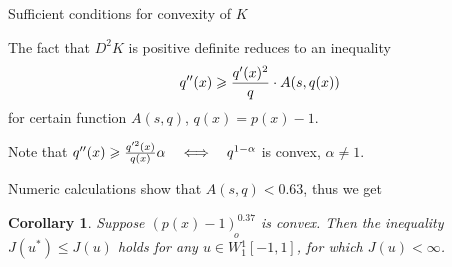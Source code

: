 \documentclass{beamer}\usepackage[]{graphicx}\usepackage[]{color}
\renewcommand{\ge}{\geqslant}
\renewcommand{\le}{\leqslant}
\newcommand{\Wf}{\stackrel{o\ }{W{}_1^1}}
\newtheorem{cor}{Corollary}
\begin{document}
\begin{frame}{Sufficient conditions for convexity of $K$}

The fact that $D^2 K$ is positive definite reduces to an inequality
$$q''(x) \ge {q'(x)^2 \over q} \cdot A(s, q(x))$$
for certain function $A(s, q)$, $q(x) = p(x) - 1$.

Note that \quad
$q''(x) \ge {q'^2(x) \over q(x)} \alpha \quad \Longleftrightarrow \quad q^{1 - \alpha}$ is convex, $\alpha \neq 1$.

Numeric calculations show that $A(s, q) < 0.63$, thus we get
\begin{cor}
Suppose $(p(x) - 1)^{0.37}$ is convex.
Then the inequality $J(u^*) \le J(u)$ holds for any $u \in \Wf[-1, 1]$, for which $J(u) < \infty$.
\end{cor}

\end{frame}
\end{document}

